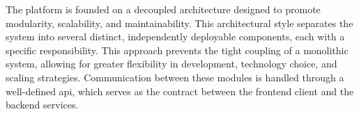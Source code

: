 The platform is founded on a decoupled architecture designed to promote modularity, scalability, and maintainability. This architectural style separates the system into several distinct, independently deployable components, each with a specific responsibility. This approach prevents the tight coupling of a monolithic system, allowing for greater flexibility in development, technology choice, and scaling strategies. Communication between these modules is handled through a well-defined \acs{api}, which serves as the contract between the frontend client and the backend services.
